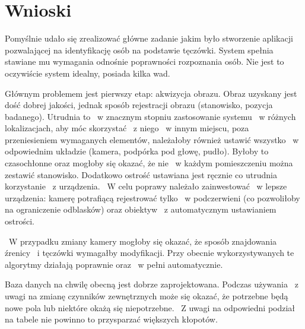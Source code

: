 \section{Wnioski}
\label{sec:wnioski}

Pomyślnie udało się zrealizować główne zadanie jakim było stworzenie aplikacji pozwalającej na identyfikację osób na podstawie tęczówki. System spełnia stawiane mu wymagania odnośnie poprawności rozpoznania osób. Nie jest to oczywiście system idealny, posiada kilka wad.

Głównym problemem jest pierwszy etap: akwizycja obrazu. Obraz uzyskany jest dość dobrej jakości, jednak sposób rejestracji obrazu (stanowisko, pozycja badanego). Utrudnia to ~w znacznym stopniu zastosowanie systemu ~w różnych lokalizacjach, aby móc skorzystać ~z niego ~w innym miejscu, poza przeniesieniem wymaganych elementów, należałoby również ustawić wszystko ~w odpowiednim układzie (kamera, podpórka pod głowę, pudło). Byłoby to czasochłonne oraz mogłoby się okazać, że nie ~w każdym pomieszczeniu można zestawić stanowisko. Dodatkowo ostrość ustawiana jest ręcznie co utrudnia korzystanie ~z urządzenia. ~W celu poprawy należało zainwestować ~w lepsze urządzenia: kamerę potrafiącą rejestrować tylko ~w podczerwieni (co pozwoliłoby na ograniczenie odblasków) oraz obiektyw ~z automatycznym ustawianiem ostrości.

~W przypadku zmiany kamery mogłoby się okazać, że sposób znajdowania źrenicy ~i tęczówki wymagałby modyfikacji. Przy obecnie wykorzystywanych te algorytmy działają poprawnie oraz ~w pełni automatycznie.

Baza danych na chwilę obecną jest dobrze zaprojektowana. Podczas używania ~z uwagi na zmianę czynników zewnętrznych może się okazać, że potrzebne będą nowe pola lub niektóre okażą się niepotrzebne. ~Z uwagi na odpowiedni podział na tabele nie powinno to przysparzać większych kłopotów.




